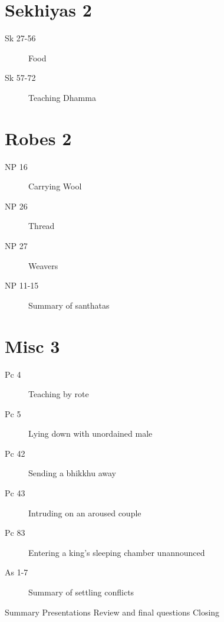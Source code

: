 \documentclass[11pt,oneside]{memoir}
\begin{document}
\begin{multicols}{2}

\section{Sekhiyas 2}

\begin{description}
\item[Sk 27-56] Food
\item[Sk 57-72] Teaching Dhamma
\end{description}

\section{Robes 2}

\begin{description}
\item[NP 16 \orig] Carrying Wool%
\item[NP 26] Thread
\item[NP 27] Weavers
\item[NP 11-15] Summary of santhatas
\end{description}

\columnbreak

\section{Misc 3}

\begin{description}
\item[Pc 4] Teaching by rote
\item[Pc 5 \orig] Lying down with unordained male%
\item[Pc 42] Sending a bhikkhu away
\item[Pc 43 \orig] Intruding on an aroused couple%
\item[Pc 83 \orig] Entering a king's sleeping chamber unannounced%
\item[As 1-7] Summary of settling conflicts
\end{description}

\end{multicols}

\vspace*{\baselineskip}

\numberedtopicsfalse
\centeringsectiontrue

{\centering
{}

\vspace*{5pt}

 Summary\quad
{} Presentations\quad
{} Review and final questions\quad
{} Closing

\par}
\end{document}
